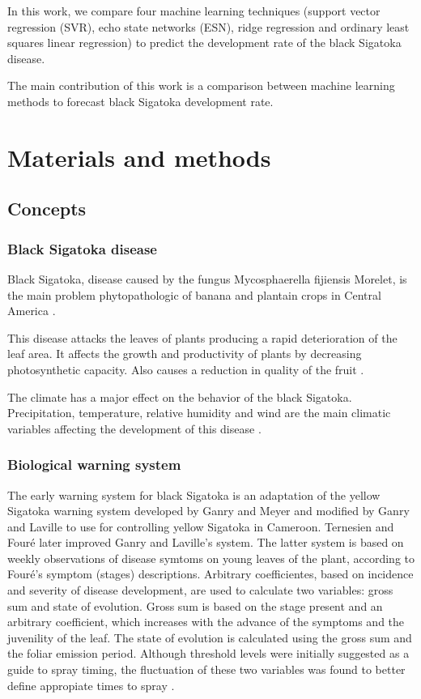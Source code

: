 \documentclass[review]{elsarticle}
\begin{document}
In this work, we compare four machine learning techniques (support vector
regression (SVR), echo state networks (ESN), ridge regression and
ordinary least squares linear regression) to predict the development rate of the black Sigatoka disease.

The main contribution of this work is a comparison between machine
learning methods to forecast black Sigatoka development rate. 


\section{Materials and methods}

\subsection{Concepts}
\subsubsection{Black Sigatoka disease}

Black Sigatoka, disease caused by the fungus Mycosphaerella fijiensis Morelet, is the main problem phytopathologic of banana and plantain crops in Central America \citep{MarinVargas1995}. 

This disease attacks the leaves of plants producing a rapid deterioration of the leaf area. It affects the growth and productivity of plants by decreasing photosynthetic capacity. Also causes a reduction in quality of the fruit \citep{MarinVargas1995}. 

The climate has a major effect on the behavior of the black Sigatoka. Precipitation, temperature, relative humidity and wind are the main climatic variables affecting the development of this disease \citep{MarinVargas1995}.

\subsubsection{Biological warning system}

The early warning system for black Sigatoka is an adaptation of the yellow Sigatoka warning system developed by Ganry and Meyer and modified by Ganry and Laville to use for controlling yellow Sigatoka in Cameroon. Ternesien and Four\'e  later improved Ganry and Laville's system. The latter system is based on weekly observations of disease symtoms on young leaves of the plant, according to Four\'e's symptom (stages) descriptions. Arbitrary coefficientes, based on incidence and severity of disease development, are used to calculate two variables: gross sum and state of evolution. Gross sum is based on the stage present and an arbitrary coefficient, which increases with the advance of the symptoms and the juvenility of the leaf. The state of evolution is calculated using the gross sum and the foliar emission period. Although threshold levels were initially suggested as a guide to spray timing, the fluctuation of these two variables was found to better define appropiate times to spray \citep{Marinetal2003}.
\end{document}
